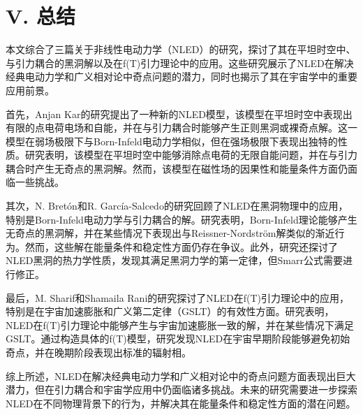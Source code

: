 \documentclass[aps,prl,preprint,groupedaddress,showkeys]{revtex4-2}
\begin{document}
\section{V. 总结}

本文综合了三篇关于非线性电动力学（NLED）的研究，探讨了其在平坦时空中、与引力耦合的黑洞解以及在f(T)引力理论中的应用。这些研究展示了NLED在解决经典电动力学和广义相对论中奇点问题的潜力，同时也揭示了其在宇宙学中的重要应用前景。

首先，Anjan Kar的研究提出了一种新的NLED模型，该模型在平坦时空中表现出有限的点电荷电场和自能，并在与引力耦合时能够产生正则黑洞或裸奇点解。这一模型在弱场极限下与Born-Infeld电动力学相似，但在强场极限下表现出独特的性质。研究表明，该模型在平坦时空中能够消除点电荷的无限自能问题，并在与引力耦合时产生无奇点的黑洞解。然而，该模型在磁性场的因果性和能量条件方面仍面临一些挑战。

其次，N. Bretón和R. García-Salcedo的研究回顾了NLED在黑洞物理中的应用，特别是Born-Infeld电动力学与引力耦合的解。研究表明，Born-Infeld理论能够产生无奇点的黑洞解，并在某些情况下表现出与Reissner-Nordström解类似的渐近行为。然而，这些解在能量条件和稳定性方面仍存在争议。此外，研究还探讨了NLED黑洞的热力学性质，发现其满足黑洞力学的第一定律，但Smarr公式需要进行修正。

最后，M. Sharif和Shamaila Rani的研究探讨了NLED在f(T)引力理论中的应用，特别是在宇宙加速膨胀和广义第二定律（GSLT）的有效性方面。研究表明，NLED在f(T)引力理论中能够产生与宇宙加速膨胀一致的解，并在某些情况下满足GSLT。通过构造具体的f(T)模型，研究发现NLED在宇宙早期阶段能够避免初始奇点，并在晚期阶段表现出标准的辐射相。

综上所述，NLED在解决经典电动力学和广义相对论中的奇点问题方面表现出巨大潜力，但在引力耦合和宇宙学应用中仍面临诸多挑战。未来的研究需要进一步探索NLED在不同物理背景下的行为，并解决其在能量条件和稳定性方面的潜在问题。

\subsection{}
\subsubsection{}
\end{document}
